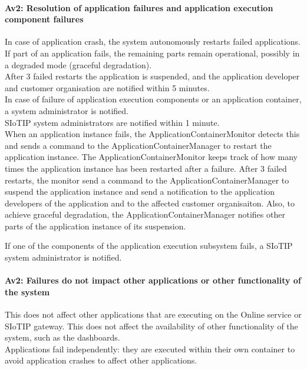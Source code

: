     \paragraph{Av2: Resolution of application failures and application execution component failures}
        In case of application crash, the system autonomously restarts failed applications.
        If part of an application fails, the remaining parts remain operational,
        possibly in a degraded mode (graceful degradation). \\
        After 3 failed restarts the application is suspended, and the
        application developer and customer organisation are notified within 5 minutes.\\

        In case of failure of application execution components or an application
        container, a system administrator is notified. \\
        SIoTIP system administrators are notified within 1 minute.\\

        When an application instance fails, the ApplicationContainerMonitor detects this and
        sends a command to the ApplicationContainerManager to restart the application instance.
        The ApplicationContainerMonitor keeps track of how many times the
        application instance has been restarted after a failure. After 3 failed restarts, the monitor
        send a command to the ApplicationContainerManager to suspend the application instance and send
        a notification to the application developers of the application and to the
        affected customer organisaiton. Also, to achieve graceful degradation,
        the ApplicationContainerManager notifies other parts of the application instance
        of its suspension.

        If one of the components of the application execution subsystem fails,
        a SIoTIP system administrator is notified.

    \paragraph{Av2: Failures do not impact other applications or other functionality of the system}
        This does not affect other applications that are executing on the Online
        service or SIoTIP gateway. This does not affect the availability of
        other functionality of the system, such as the dashboards. \\
        Applications fail independently: they are executed within their own
        container to avoid application crashes to affect other applications.\\

